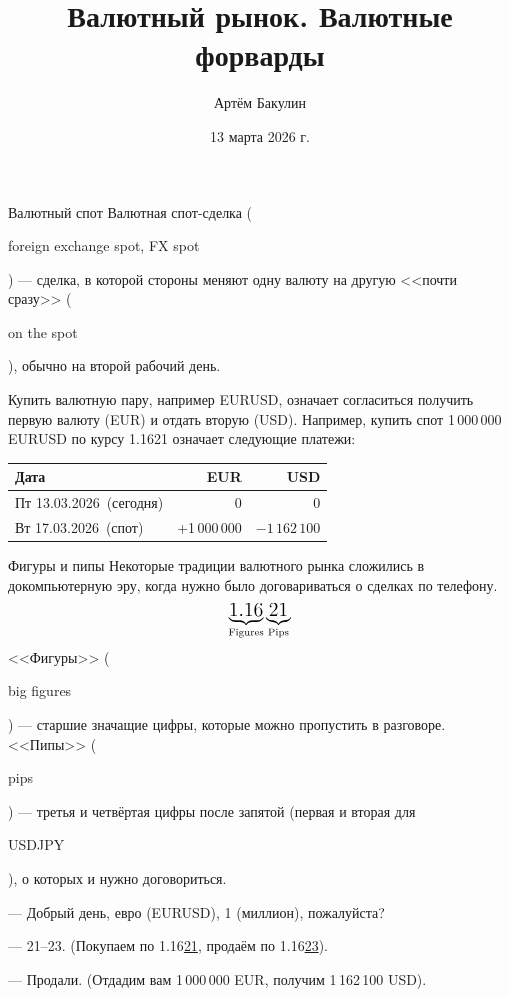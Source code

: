 \documentclass{beamer}
\title{Валютный рынок. Валютные форварды}
\author{Артём Бакулин}
\date{13 марта 2026 г.}
\newcommand{\en}[1]{\begin{otherlanguage}{english}#1\end{otherlanguage}}
\newcommand{\eurusdBigFigures}{1.16}
\newcommand{\eurusdBigFiguresPerMillion}{1\,16}
\newcommand{\eurusdBusinessDate}{Пт 13.03.2026}
\newcommand{\eurusdSpotDate}{Вт 17.03.2026}
\begin{document}
\begin{frame}
\titlepage
\end{frame}



\begin{frame}{Валютный спот}
\justify
\alert{Валютная спот-сделка} (\en{foreign exchange spot, FX spot}) --- сделка, в которой стороны меняют одну валюту на другую <<почти сразу>> (\en{on the spot}), обычно на второй рабочий день.

\justify
Купить валютную пару, например EURUSD, означает согласиться получить первую валюту (EUR) и отдать вторую (USD). Например, купить спот 1\,000\,000 EURUSD по курсу \eurusdBigFigures21 означает следующие платежи:

\justify
\centering
\begin{tabular}{l|r|r}
Дата                          & EUR & USD \\ \hline
\eurusdBusinessDate\ (сегодня)  & 0   & 0   \\
\eurusdSpotDate\ (спот)     & +1\,000\,000 & $-\eurusdBigFiguresPerMillion2\,100$
\end{tabular}
\end{frame}



\begin{frame}{Фигуры и пипы}
\justify
Некоторые традиции валютного рынка сложились в докомпьютерную эру, когда нужно
было договариваться о сделках по телефону.
\begin{align*}
\underbrace{\text{\Large \eurusdBigFigures}}_{\text{Figures}}\underbrace{\text{\Large 21}}_{\text{Pips}}
\end{align*}
\justify
<<Фигуры>> (\en{big figures}) ---  старшие значащие цифры, которые можно пропустить в 
разговоре. <<Пипы>> (\en{pips}) --- третья и четвёртая цифры после запятой (первая и вторая 
для \en{USDJPY}), о которых и нужно договориться.

\justify
--- Добрый день, евро (EURUSD), 1 (миллион), пожалуйста?

--- 21--23. (Покупаем по \eurusdBigFigures\underline{21}, продаём по \eurusdBigFigures\underline{23}).

--- Продали. (Отдадим вам 1\,000\,000 EUR, получим \eurusdBigFiguresPerMillion2\,100 USD).
\end{frame}
\end{document}
